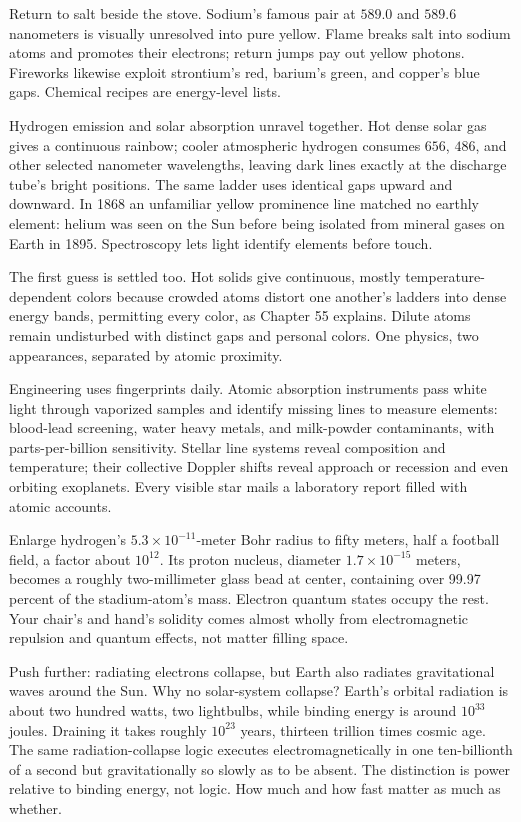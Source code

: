 \begin{mainline}
Return to salt beside the stove. Sodium's famous pair at \(589.0\) and \(589.6\) nanometers is visually unresolved into pure yellow. Flame breaks salt into sodium atoms and promotes their electrons; return jumps pay out yellow photons. Fireworks likewise exploit strontium's red, barium's green, and copper's blue gaps. Chemical recipes are energy-level lists.

Hydrogen emission and solar absorption unravel together. Hot dense solar gas gives a continuous rainbow; cooler atmospheric hydrogen consumes \(656\), \(486\), and other selected nanometer wavelengths, leaving dark lines exactly at the discharge tube's bright positions. The same ladder uses identical gaps upward and downward. In 1868 an unfamiliar yellow prominence line matched no earthly element: helium was seen on the Sun before being isolated from mineral gases on Earth in 1895. Spectroscopy lets light identify elements before touch.

The first guess is settled too. Hot solids give continuous, mostly temperature-dependent colors because crowded atoms distort one another's ladders into dense energy bands, permitting every color, as Chapter 55 explains. Dilute atoms remain undisturbed with distinct gaps and personal colors. One physics, two appearances, separated by atomic proximity.

Engineering uses fingerprints daily. Atomic absorption instruments pass white light through vaporized samples and identify missing lines to measure elements: blood-lead screening, water heavy metals, and milk-powder contaminants, with parts-per-billion sensitivity. Stellar line systems reveal composition and temperature; their collective Doppler shifts reveal approach or recession and even orbiting exoplanets. Every visible star mails a laboratory report filled with atomic accounts.
\end{mainline}


\begin{thought}
Enlarge hydrogen's \(5.3\times10^{-11}\)-meter Bohr radius to fifty meters, half a football field, a factor about \(10^{12}\). Its proton nucleus, diameter \(1.7\times10^{-15}\) meters, becomes a roughly two-millimeter glass bead at center, containing over 99.97 percent of the stadium-atom's mass. Electron quantum states occupy the rest. Your chair's and hand's solidity comes almost wholly from electromagnetic repulsion and quantum effects, not matter filling space.

Push further: radiating electrons collapse, but Earth also radiates gravitational waves around the Sun. Why no solar-system collapse? Earth's orbital radiation is about two hundred watts, two lightbulbs, while binding energy is around \(10^{33}\) joules. Draining it takes roughly \(10^{23}\) years, thirteen trillion times cosmic age. The same radiation-collapse logic executes electromagnetically in one ten-billionth of a second but gravitationally so slowly as to be absent. The distinction is power relative to binding energy, not logic. How much and how fast matter as much as whether.
\end{thought}

